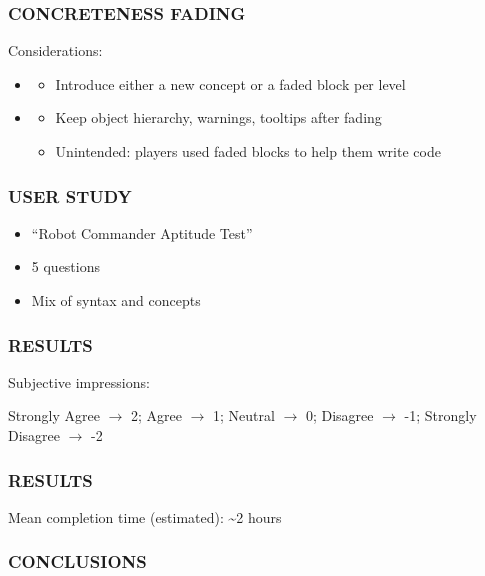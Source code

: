 \documentclass{beamer}
\let\theframetitle\frametitle
\renewcommand\frametitle[1]{\theframetitle{\MakeUppercase{#1}}}
\begin{document}
\begin{frame}
\frametitle{Concreteness Fading}
Considerations:
\begin{itemize}
\item<1-> 
  \begin{itemize}
  \item<2-> Introduce either a new concept or a faded block per level
  \end{itemize}
\item<1-> 
  \begin{itemize}
  \item<3-> Keep object hierarchy, warnings, tooltips after fading
  \item<3-> Unintended: players used faded blocks to help them write code
  \end{itemize}
\end{itemize}
\end{frame}

\begin{frame}
\frametitle{User Study}
\begin{itemize}
\item ``Robot Commander Aptitude Test''
\item 5 questions
\item Mix of syntax and concepts
\end{itemize}
\end{frame}

\begin{frame}
\frametitle{Results}
Subjective impressions:


\begin{center}
  Strongly Agree $\rightarrow$ 2; Agree $\rightarrow$ 1; Neutral $\rightarrow$ 0; Disagree $\rightarrow$ -1; Strongly Disagree $\rightarrow$ -2
\end{center}
\end{frame}

\begin{frame}
\frametitle{Results}

Mean completion time (estimated): \textasciitilde{}2 hours
\end{frame}

\begin{frame}
\frametitle{Conclusions}
\end{frame}
\end{document}
